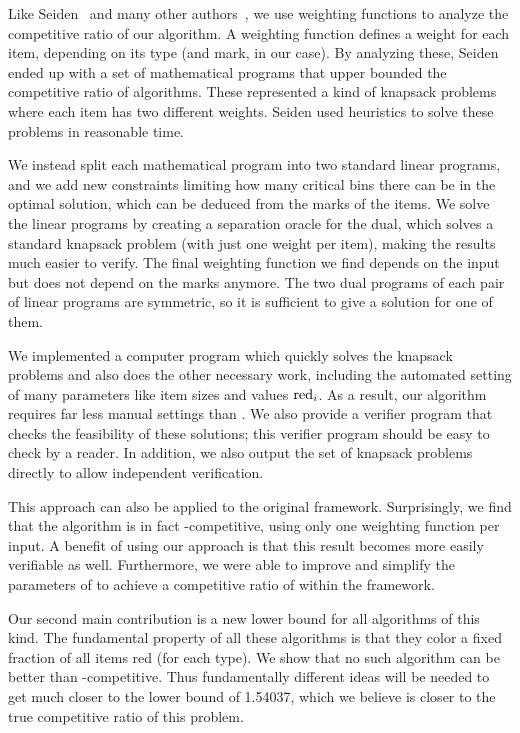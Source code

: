 Like Seiden~\cite{Seiden02} and many other authors~\cite{Ullman71,LeeLee85,RaBrLL89}, we use weighting functions to analyze the competitive ratio of our algorithm. 
A weighting function defines a weight for each item, depending on its type (and mark, in our case). 
By analyzing these, 
Seiden ended up with a set of mathematical programs that upper bounded
the competitive ratio of {\SuperH} algorithms. These
represented a kind of knapsack problems where each item has two
different weights.
Seiden used heuristics to solve these problems in reasonable time.

We instead split each mathematical program into two standard linear programs, and we add new constraints limiting how many critical bins there can be in the optimal solution, which can be deduced from the marks of the items. We solve the linear programs by creating a separation oracle for the dual, which solves a standard knapsack problem (with just one weight per item), making the results much easier to verify. The final weighting function we find depends on the input but does not depend on the marks anymore.
The two dual programs of each pair of linear programs are symmetric, so it is sufficient to give a solution for one of them.


We implemented a computer program which quickly solves the knapsack problems and also does the other necessary work, including the automated setting of many parameters like item sizes and values $\mathrm{red}_i$. As a result, our algorithm  {\SonofH} requires far less manual settings than \Hpp. We also provide a verifier program that checks the feasibility of these solutions; this verifier program should be easy to check by a reader. In addition, we also output the set of knapsack problems directly to allow independent verification.

This approach can also be applied to the original {\SuperH} framework. Surprisingly, we find that the algorithm {\Hpp} is in fact \superhratio-competitive,
using only one weighting function per input. 
A benefit of using our approach is that this result becomes more easily verifiable as well. 
Furthermore, we were able to improve and simplify the parameters of {\Hpp} to achieve a competitive ratio of {\newsuperhratio} within the {\SuperH} framework.

Our second main contribution is a new lower bound for all algorithms of this kind.
The fundamental property of all these algorithms is that they color a fixed fraction
of all items red (for each type). 
We show that no such algorithm can be better
than {\finallb}-competitive. Thus fundamentally different ideas will be needed to
get much closer to the lower bound of 1.54037, which we believe is closer to the
true competitive ratio of this problem.



